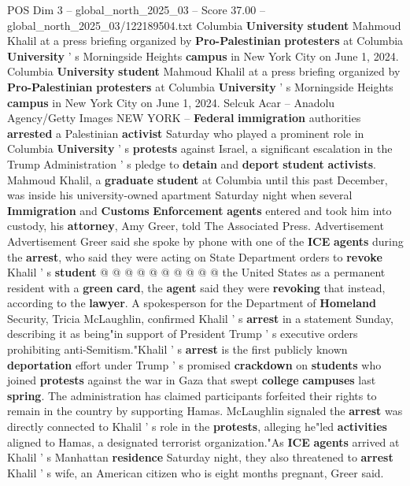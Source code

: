 \begin{textsample}{POS Dim 3 – global\_north\_2025\_03 – Score 37.00 – global\_north\_2025\_03/122189504.txt}  \label{ex:f3_pos_024}
Columbia \textbf{University} \textbf{student} Mahmoud Khalil at a press briefing organized by \textbf{Pro-Palestinian} \textbf{protesters} at Columbia \textbf{University} ' s Morningside Heights \textbf{campus} in New York City on June 1, 2024.
Columbia \textbf{University} \textbf{student} Mahmoud Khalil at a press briefing organized by \textbf{Pro-Palestinian} \textbf{protesters} at Columbia \textbf{University} ' s Morningside Heights \textbf{campus} in New York City on June 1, 2024.
Selcuk Acar -- Anadolu Agency/Getty Images NEW YORK -- \textbf{Federal} \textbf{immigration} authorities \textbf{arrested} a Palestinian \textbf{activist} Saturday who played a prominent role in Columbia \textbf{University} ' s \textbf{protests} against Israel, a significant escalation in the Trump Administration ' s pledge to \textbf{detain} and \textbf{deport} \textbf{student} \textbf{activists}.
Mahmoud Khalil, a \textbf{graduate} \textbf{student} at Columbia until this past December, was inside his university-owned apartment Saturday night when several \textbf{Immigration} and \textbf{Customs} \textbf{Enforcement} \textbf{agents} entered and took him into custody, his \textbf{attorney}, Amy Greer, told The Associated Press.
Advertisement Advertisement Greer said she spoke by phone with one of the \textbf{ICE} \textbf{agents} during the \textbf{arrest}, who said they were acting on State Department orders to \textbf{revoke} Khalil ' s \textbf{student} @ @ @ @ @ @ @ @ @ @ the United States as a permanent resident with a \textbf{green} \textbf{card}, the \textbf{agent} said they were \textbf{revoking} that instead, according to the \textbf{lawyer}.
A spokesperson for the Department of \textbf{Homeland} Security, Tricia McLaughlin, confirmed Khalil ' s \textbf{arrest} in a statement Sunday, describing it as being"in support of President Trump ' s executive orders prohibiting anti-Semitism."Khalil ' s \textbf{arrest} is the first publicly known \textbf{deportation} effort under Trump ' s promised \textbf{crackdown} on \textbf{students} who joined \textbf{protests} against the war in Gaza that swept \textbf{college} \textbf{campuses} last \textbf{spring}.
The administration has claimed participants forfeited their rights to remain in the country by supporting Hamas.
McLaughlin signaled the \textbf{arrest} was directly connected to Khalil ' s role in the \textbf{protests}, alleging he"led \textbf{activities} aligned to Hamas, a designated terrorist organization."As \textbf{ICE} \textbf{agents} arrived at Khalil ' s Manhattan \textbf{residence} Saturday night, they also threatened to \textbf{arrest} Khalil ' s wife, an American citizen who is eight months pregnant, Greer said.

\end{textsample}
